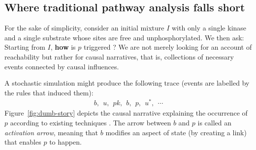 













%




\subsection{Where traditional pathway analysis falls short}



For the sake of simplicity, consider an initial mixture $I$ with only
a single kinase and a single substrate whose sites are free and
unphosphorylated. We then ask: Starting from $I$, \textbf{how} is $p$
triggered ? We are not merely looking for an account of reachability
but rather for causal narratives, that is, collections of necessary
events connected by causal influences. 

A stochastic simulation \cite{DanosEtAl-APLAS07} might produce the
following trace (events are labelled by the rules that induced them):
\begin{align}\label{example-trace} b,\ \ u,\ \ pk,\ \ b,\ \ p,\ \
  u^{*},\ \ \cdots
\end{align} Figure~\ref{fig:dumb-story} depicts the causal narrative
explaining the occurrence of $p$ according to existing techniques
\cite{DBLP:conf/fsttcs/DanosFFHH12,DanosEtAl-CONCUR07}. The arrow
between $b$ and $p$ is called an \textit{activation arrow}, meaning
that $b$ modifies an aspect of state (by creating a link) that enables
$p$ to happen.



